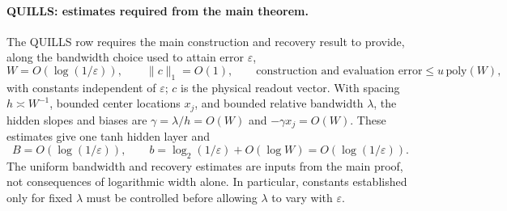 \paragraph{QUILLS: estimates required from the main theorem.}
The QUILLS row requires the main construction and recovery result to
provide, along the bandwidth choice used to attain error $\varepsilon$,
\[
 W=O(\log(1/\varepsilon)),\qquad
 \|c\|_1=O(1),\qquad
 \text{construction and evaluation error}\le u\,\mathrm{poly}(W),
\]
with constants independent of $\varepsilon$; $c$ is the physical readout
vector. With spacing $h\asymp W^{-1}$, bounded center locations $x_j$,
and bounded relative bandwidth $\lambda$, the hidden slopes and biases
are $\gamma=\lambda/h=O(W)$ and $-\gamma x_j=O(W)$.
These estimates give one tanh hidden layer and
\[
 B=O(\log(1/\varepsilon)),\qquad
 b=\log_2(1/\varepsilon)+O(\log W)=O(\log(1/\varepsilon)).
\]
The uniform bandwidth and recovery estimates are inputs from the main
proof, not consequences of logarithmic width alone. In particular,
constants established only for fixed $\lambda$ must be controlled before
allowing $\lambda$ to vary with $\varepsilon$.